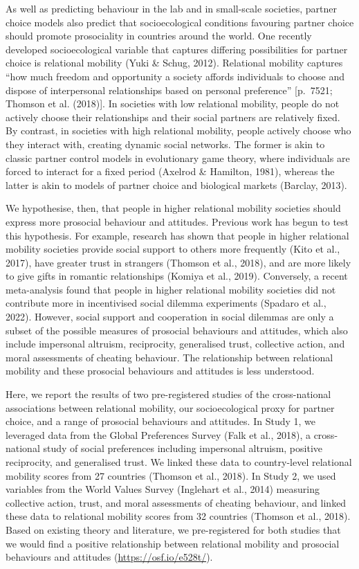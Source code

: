 \documentclass[
  man,floatsintext]{apa6}
\begin{document}
As well as predicting behaviour in the lab and in small-scale societies, partner choice models also predict that socioecological conditions favouring partner choice should promote prosociality in countries around the world. One recently developed socioecological variable that captures differing possibilities for partner choice is relational mobility (Yuki \& Schug, 2012). Relational mobility captures ``how much freedom and opportunity a society affords individuals to choose and dispose of interpersonal relationships based on personal preference'' {[}p.~7521; Thomson et al. (2018){]}. In societies with low relational mobility, people do not actively choose their relationships and their social partners are relatively fixed. By contrast, in societies with high relational mobility, people actively choose who they interact with, creating dynamic social networks. The former is akin to classic partner control models in evolutionary game theory, where individuals are forced to interact for a fixed period (Axelrod \& Hamilton, 1981), whereas the latter is akin to models of partner choice and biological markets (Barclay, 2013).

We hypothesise, then, that people in higher relational mobility societies should express more prosocial behaviour and attitudes. Previous work has begun to test this hypothesis. For example, research has shown that people in higher relational mobility societies provide social support to others more frequently (Kito et al., 2017), have greater trust in strangers (Thomson et al., 2018), and are more likely to give gifts in romantic relationships (Komiya et al., 2019). Conversely, a recent meta-analysis found that people in higher relational mobility societies did not contribute more in incentivised social dilemma experiments (Spadaro et al., 2022). However, social support and cooperation in social dilemmas are only a subset of the possible measures of prosocial behaviours and attitudes, which also include impersonal altruism, reciprocity, generalised trust, collective action, and moral assessments of cheating behaviour. The relationship between relational mobility and these prosocial behaviours and attitudes is less understood.

Here, we report the results of two pre-registered studies of the cross-national associations between relational mobility, our socioecological proxy for partner choice, and a range of prosocial behaviours and attitudes. In Study 1, we leveraged data from the Global Preferences Survey (Falk et al., 2018), a cross-national study of social preferences including impersonal altruism, positive reciprocity, and generalised trust. We linked these data to country-level relational mobility scores from 27 countries (Thomson et al., 2018). In Study 2, we used variables from the World Values Survey (Inglehart et al., 2014) measuring collective action, trust, and moral assessments of cheating behaviour, and linked these data to relational mobility scores from 32 countries (Thomson et al., 2018). Based on existing theory and literature, we pre-registered for both studies that we would find a positive relationship between relational mobility and prosocial behaviours and attitudes (\url{https://osf.io/e528t/}).
\end{document}

